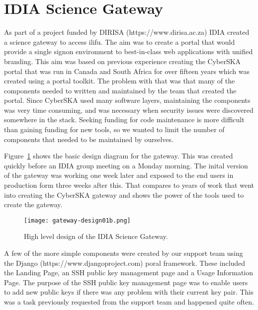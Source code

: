 \documentclass{iau_FM}
\begin{document}
\section{IDIA Science Gateway}
\label{sec:gateway}

As part of a project funded by DIRISA (https://www.dirisa.ac.za) IDIA created a science gateway to access ilifu. The aim was to create
a portal that would provide a single signon environment to best-in-class web applications with unified branding. 
This aim was based on 
previous experience creating the CyberSKA~\cite{cyberska} portal that was run in
 Canada and South Africa for over fifteen 
years which
was created using a portal toolkit. The problem with that was that many of the components needed to written and maintained
by the team that created the portal. Since CyberSKA used many software 
layers, maintaining the components was very time consuming, and was necessary when security issues were discovered
somewhere in the stack.
Seeking funding for code maintenance is more difficult than gaining funding 
for new tools, so we wanted to limit the number of
components that needed to be maintained by ourselves.

Figure~\ref{fig:gateway_design} shows the basic design diagram for the gateway. This was created
quickly before an IDIA group meeting on a Monday morning. The inital version of the gateway was working one week later and
exposed to the end users in production form three weeks after this. That compares to years of work that went
 into creating the CyberSKA gateway
and shows the power of the tools used to create the gateway.

\begin{figure}
    \centering
    \texttt{[image: gateway-design01b.png]}
    \caption{High level design of the IDIA Science Gateway.}
    \label{fig:gateway_design}
\end{figure}

A few of the more simple components were created by our support team using the Django 
(https://www.djangoproject.com)
poral framework.
These included the Landing Page, an SSH public 
key management page and a Usage Information
Page. The purpose of the SSH public key management page was to enable users to add new public keys if
there was any problem with their current key pair. This was a task previously requested from the
support team and happened quite often.
\end{document}
